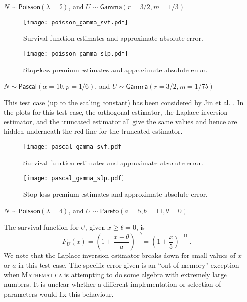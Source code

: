 
\begin{test}
$N\sim\mathsf{Poisson}(\lambda=2)$, and $U\sim\mathsf{Gamma}(r=3/2,m=1/3)$
\end{test}

\begin{figure}[H]
\centering
\texttt{[image: poisson\_gamma\_svf.pdf]}
\caption{Survival function estimates and approximate absolute error.}
\end{figure}

\begin{figure}[H]
\centering
\texttt{[image: poisson\_gamma\_slp.pdf]}
\caption{Stop-loss premium estimates and approximate absolute error.}
\end{figure}


\begin{test}
$N\sim\mathsf{Pascal}(\alpha=10,p=1/6)$, and $U\sim\mathsf{Gamma}(r=3/2,m=1/75)$
\end{test}

This test case (up to the scaling constant) has been considered by Jin et al. \cite[Example 3]{JiPrRe16}. In the plots for this test case, the orthogonal estimator, the Laplace inversion estimator, and the truncated estimator all give the same values and hence are hidden underneath the red line for the truncated estimator.

\begin{figure}[H]
\centering
\texttt{[image: pascal\_gamma\_svf.pdf]}
\caption{Survival function estimates and approximate absolute error.}
\end{figure}

\begin{figure}[H]
\centering
\texttt{[image: pascal\_gamma\_slp.pdf]}
\caption{Stop-loss premium estimates and approximate absolute error.}
\end{figure}

\begin{test} $N\sim\mathsf{Poisson}(\lambda=4)$, and $U\sim\mathsf{Pareto}(a=5,b=11,\theta=0)$
\end{test}
The survival function for $U$, given $x \ge \theta=0$, is
\[ \overline{F}_U(x) = \left( 1 + \frac{x-\theta}{a} \right)^{-b} = \left( 1 + \frac{x}{5} \right)^{-11} \,. \]
We note that the Laplace inversion estimator breaks down for small values of $x$ or $a$ in this test case. The specific error given is an ``out of memory'' exception when \textsc{Mathematica} is attempting to do some algebra with extremely large numbers. It is unclear whether a different implementation or selection of parameters would fix this behaviour.

